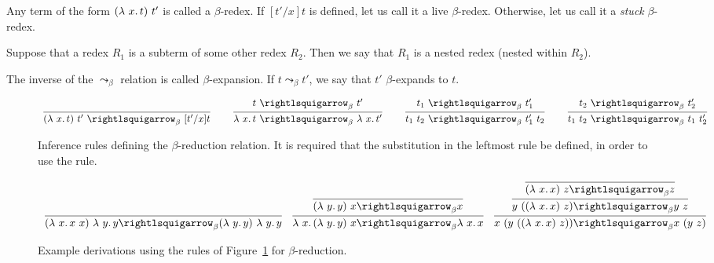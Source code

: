 \begin{definition}
\label{def:bredex}
  Any term of the form $(\lambda\ x.\, t)\ t'$ is called a $\beta$-redex.
  If $[t'/x]t$ is defined, let us call it a live $\beta$-redex.  Otherwise, let us call it
  a \emph{stuck} $\beta$-redex.
  \end{definition}

\begin{definition}
  Suppose that a redex $R_1$ is a subterm of some other redex $R_2$.
  Then we say that $R_1$ is a nested redex (nested within $R_2$).
  \end{definition}
 
\begin{definition}
\label{def:betaexpand}
  The inverse of the $\leadsto_\beta$ relation is called
  $\beta$-expansion.  If $t \leadsto_\beta t'$, we say
  that $t'$ $\beta$-expands to $t$.
\end{definition}

\begin{figure}
  \[
  \begin{array}{lllllll}
\infer{(\lam{x}{t})\ t'\ \betar\ [t'/x]t}{\ } & \ &
\infer{\lam{x}{t}\ \betar\ \lam{x}{t'}}{t\ \betar\ t'} & \ &
\infer{t_1\ t_2\ \betar\ t_1'\ t_2}{t_1\ \betar\ t_1'} &\ &
\infer{t_1\ t_2\ \betar\ t_1\ t_2'}{t_2\ \betar\ t_2'}
  \end{array}
  \]
  \caption{Inference rules defining the $\beta$-reduction relation.  It is required that the substitution in the leftmost rule be defined, in order to use the rule.}
  \label{fig:betar}
\end{figure}

\begin{figure}
  \[
  \begin{array}{lll}
    \infer{(\lam{x}{x\ x})\ \lam{y}{y} \betar (\lam{y}{y})\ \lam{y}{y}}
          {\ }
    &
    \infer{\lam{x}{(\lam{y}{y})\ x} \betar \lam{x}{x}}
          {\infer{(\lam{y}{y})\ x \betar x}{\ }}

    &

    \infer{x\ (y\ ((\lam{x}{x})\ z)) \betar x\ (y\ z)}
          {\infer{y\ ((\lam{x}{x})\ z) \betar y\ z}
            {\infer{(\lam{x}{x})\ z \betar z}{\ }}}
  \end{array}
\]
\caption{Example derivations using the rules of Figure~\ref{fig:betar} for $\beta$-reduction.}
\label{fig:betarex}
\end{figure}

